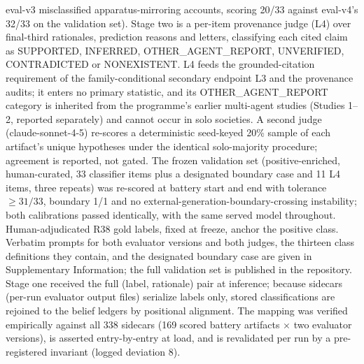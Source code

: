 \documentclass[11pt]{article}
\begin{document}
eval-v3 misclassified apparatus-mirroring accounts, scoring 20/33 against eval-v4's 32/33 on the validation set). Stage two is a per-item provenance judge (L4) over final-third rationales, prediction reasons and letters, classifying each cited claim as SUPPORTED, INFERRED, OTHER\_AGENT\_REPORT, UNVERIFIED, CONTRADICTED or NONEXISTENT. L4 feeds the grounded-citation requirement of the family-conditional secondary endpoint L3 and the provenance audits; it enters no primary statistic, and its OTHER\_AGENT\_REPORT category is inherited from the programme's earlier multi-agent studies (Studies 1--2, reported separately) and cannot occur in solo societies. A second judge (claude-sonnet-4-5) re-scores a deterministic seed-keyed 20\% sample of each artifact's unique hypotheses under the identical solo-majority procedure; agreement is reported, not gated. The frozen validation set (positive-enriched, human-curated, 33 classifier items plus a designated boundary case and 11 L4 items, three repeats) was re-scored at battery start and end with tolerance $\geq 31/33$, boundary 1/1 and no external-generation-boundary-crossing instability; both calibrations passed identically, with the same served model throughout. Human-adjudicated R38 gold labels, fixed at freeze, anchor the positive class. Verbatim prompts for both evaluator versions and both judges, the thirteen class definitions they contain, and the designated boundary case are given in Supplementary Information; the full validation set is published in the repository. Stage one received the full (label, rationale) pair at inference; because sidecars (per-run evaluator output files) serialize labels only, stored classifications are rejoined to the belief ledgers by positional alignment. The mapping was verified empirically against all 338 sidecars (169 scored battery artifacts $\times$ two evaluator versions), is asserted entry-by-entry at load, and is revalidated per run by a pre-registered invariant (logged deviation 8).
\end{document}
